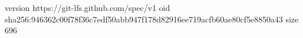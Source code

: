 version https://git-lfs.github.com/spec/v1
oid sha256:946362c00f78f36c7edf50abb947f178d82916ee719acfb60ae80cf5e8850a43
size 696
